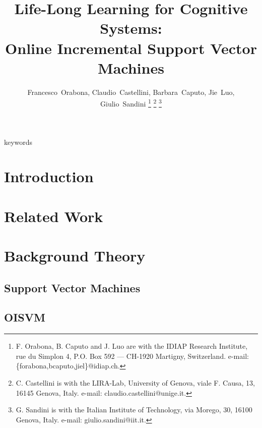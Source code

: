\documentclass[journal]{IEEEtran}
\begin{document}
\title{Life-Long Learning for Cognitive Systems:\\
Online Incremental Support Vector Machines}

\author{Francesco~Orabona, Claudio~Castellini, Barbara~Caputo, Jie~Luo, Giulio~Sandini
\thanks{
  F. Orabona, B. Caputo and J. Luo are with the IDIAP Research Institute,
  rue du Simplon 4, P.O. Box 592 --- CH-1920 Martigny, Switzerland.
  e-mail: \{forabona,bcaputo,jiel\}@idiap.ch.}%
\thanks{C. Castellini is with the LIRA-Lab, University of Genova,
  viale F. Causa, 13, 16145 Genova, Italy.
  e-mail: claudio.castellini@unige.it.}%
\thanks{G. Sandini is with the Italian Institute of Technology,
  via Morego, 30, 16100 Genova, Italy.
  e-mail: giulio.sandini@iit.it.}%
}

\maketitle

\begin{abstract}
  
\end{abstract}

\begin{IEEEkeywords}
keywords
\end{IEEEkeywords}

\IEEEpeerreviewmaketitle

\section{Introduction}
\label{sec:introduction}


\section{Related Work}
\label{sec:related-work}


\section{Background Theory}

\subsection{Support Vector Machines}
\label{subsec:SVM}


\subsection{OISVM}
\label{subsec:OISVM}

\end{document}
